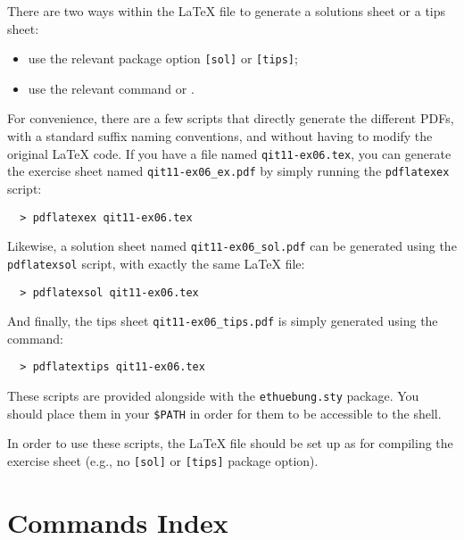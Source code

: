 \documentclass[11pt,a4paper]{article}
\begin{document}
There are two ways within the \LaTeX{} file to generate a solutions sheet or a tips sheet:
\begin{itemize}
\item use the relevant package option \texttt{[sol]} or \texttt{[tips]};
\item use the relevant command  or
  .
\end{itemize}

For convenience, there are a few scripts that directly generate the different PDFs, with a
standard suffix naming conventions, and without having to modify the original \LaTeX{}
code. If you have a file named \texttt{qit11-ex06.tex}, you can generate the exercise
sheet named \verb|qit11-ex06_ex.pdf| by simply running the \texttt{pdflatexex} script:
\begin{pkgverbatim}
\begin{verbatim}
  > pdflatexex qit11-ex06.tex
\end{verbatim}
\end{pkgverbatim}
Likewise, a solution sheet named \verb|qit11-ex06_sol.pdf| can be generated using the
\texttt{pdflatexsol} script, with exactly the same \LaTeX{} file:
\begin{pkgverbatim}
\begin{verbatim}
  > pdflatexsol qit11-ex06.tex
\end{verbatim}
\end{pkgverbatim}
And finally, the tips sheet \verb|qit11-ex06_tips.pdf| is simply generated using the
command:
\begin{pkgverbatim}
\begin{verbatim}
  > pdflatextips qit11-ex06.tex
\end{verbatim}
\end{pkgverbatim}

These scripts are provided alongside with the \texttt{ethuebung.sty} package. You should
place them in your \texttt{\$PATH} in order for them to be accessible to the shell.

\begin{pkgnotice}
  In order to use these scripts, the \LaTeX{} file should be set up as for compiling the
  exercise sheet (e.g., no \texttt{[sol]} or \texttt{[tips]} package option).
\end{pkgnotice}


\section{Commands Index}
\label{sec:AllCommands}
\end{document}
